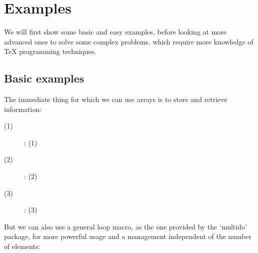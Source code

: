 \documentclass{article}
\newcommand{\MultiDoPackage}{`\textsf{multido}'}
\begin{document}
\section{Examples}

\UndefineShortVerb{\!}          %

  We will first show some basic and easy examples, before  looking at more
advanced ones to solve some complex problems, which require more knowledge of
\TeX{} programming techniques.

\subsection{Basic examples}

  The immediate thing for which we can use arrays is to store and retrieve
information:

\vspace{2mm}
\begin{SideBySideExample}[xrightmargin=6cm]
  \newarray\Actors
  \newarray\Dates
  \newarray\Sexes


  \begin{description}
    \item[\Actors(1)] : \Dates(1)
    \item[\Actors(2)] : \Dates(2)
    \item[\Actors(3)] : \Dates(3)
  \end{description}
\end{SideBySideExample}

\vspace{2mm}
  But we can also use a general loop macro, as the one provided by the
\MultiDoPackage{} package, for more powerful usage and a management
independent of the number of elements:

\vspace{2mm}
\begin{SideBySideExample}[xrightmargin=6cm]
  \newcommand{\NumberActors}{3}

  \begin{description}
    \multido{\iActor=1+1}{\NumberActors}{%
      \item[\Actors(\iActor)] : \Dates(\iActor)}
  \end{description}
\end{SideBySideExample}
\end{document}
